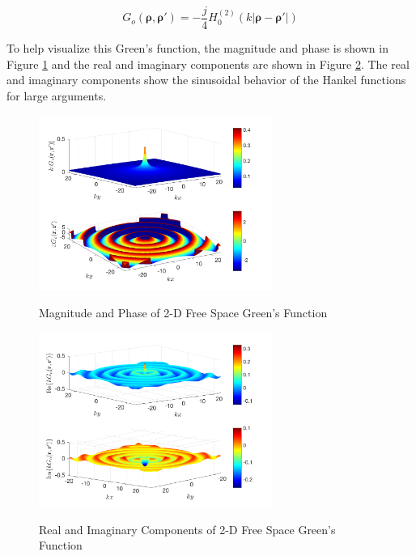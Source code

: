 \begin{equation}
\boxed{G_o\left(\boldsymbol{\rho},\boldsymbol{\rho}'\right) = -\frac{j}{4}H_0^{(2)}\left(k|\boldsymbol{\rho} - \boldsymbol{\rho}' | \right)}
\label{gf_eq:40}
\end{equation}
\renewcommand{\baselinestretch}{2} \small\normalsize

To help visualize this Green's function, the magnitude and phase is shown in Figure \ref{gf_fig:3} and the real and imaginary components are shown in Figure \ref{gf_fig:4}. The real and imaginary components show the sinusoidal behavior of the Hankel functions for large arguments.

\begin{figure}[H]
\begin{center}
\includegraphics[width=3in]{../media/2d_fs_gf_mag.png}
\end{center}
\renewcommand{\baselinestretch}{1}
\small\normalsize
\begin{quote}
\caption[Magnitude and Phase of 2-D Free Space Green's Function]{Magnitude and Phase of 2-D Free Space Green's Function \label{gf_fig:3}}
\end{quote}
\end{figure} 
\renewcommand{\baselinestretch}{2}
\small\normalsize

\begin{figure}[H]
\begin{center}
\includegraphics[width=3in]{../media/2d_fs_gf_re_im.png}
\end{center}
\renewcommand{\baselinestretch}{1}
\small\normalsize
\begin{quote}
\caption[Real and Imaginary Components of 2-D Free Space Green's Function]{Real and Imaginary Components of 2-D Free Space Green's Function \label{gf_fig:4}}
\end{quote}
\end{figure} 
\renewcommand{\baselinestretch}{2}
\small\normalsize


